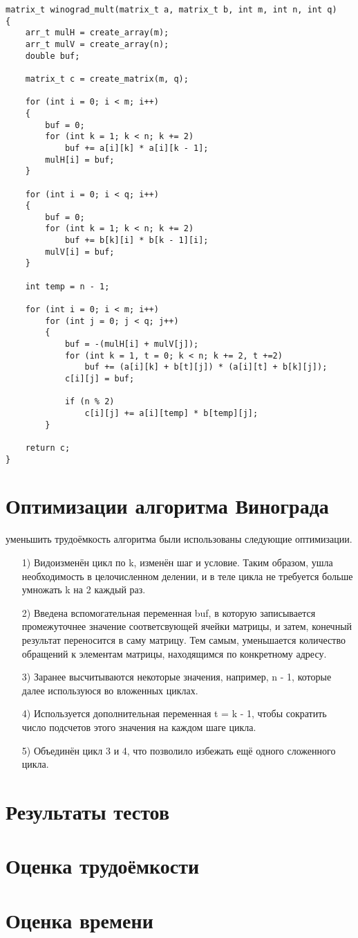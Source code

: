 \begin{lstlisting}[label=code, caption = Оптимизированный алгоритм Винограда]
matrix_t winograd_mult(matrix_t a, matrix_t b, int m, int n, int q)
{
	arr_t mulH = create_array(m);
	arr_t mulV = create_array(n);
	double buf;
	
	matrix_t c = create_matrix(m, q);
	
	for (int i = 0; i < m; i++)
	{
		buf = 0;
		for (int k = 1; k < n; k += 2)
			buf += a[i][k] * a[i][k - 1];
		mulH[i] = buf;
	}
	
	for (int i = 0; i < q; i++)
	{
		buf = 0;
		for (int k = 1; k < n; k += 2)
			buf += b[k][i] * b[k - 1][i];
		mulV[i] = buf;
	}
	
	int temp = n - 1;
	
	for (int i = 0; i < m; i++)
		for (int j = 0; j < q; j++)
		{
			buf = -(mulH[i] + mulV[j]);
			for (int k = 1, t = 0; k < n; k += 2, t +=2)
				buf += (a[i][k] + b[t][j]) * (a[i][t] + b[k][j]);
			c[i][j] = buf;
			
			if (n % 2)
				c[i][j] += a[i][temp] * b[temp][j];
		}
	
	return c;
}
\end{lstlisting}

\section{Оптимизации алгоритма Винограда}
 уменьшить трудоёмкость  алгоритма были использованы следующие оптимизации.
\begin{enumerate}
	\item[1)]Видоизменён цикл по k, изменён шаг и условие. Таким образом, ушла необходимость в целочисленном делении, и в теле цикла не требуется больше умножать k на 2 каждый раз.
	\item[2)]Введена вспомогательная переменная buf, в которую записывается промежуточнее значение соответсвующей ячейки матрицы, и затем, конечный результат переносится в саму матрицу. Тем самым, уменьшается количество обращений к элементам матрицы, находящимся по конкретному адресу.
	\item[3)]Заранее высчитываются некоторые значения, например, n - 1, которые далее используюся во вложенных циклах.
	\item[4)]Используется дополнительная переменная t = k - 1, чтобы сократить число подсчетов этого значения на каждом шаге цикла. 
	\item[5)]Объединён цикл 3 и 4, что позволило избежать ещё одного сложенного цикла.
\end{enumerate}

\section{Результаты тестов}


\section{Оценка трудоёмкости}

\section{Оценка времени}